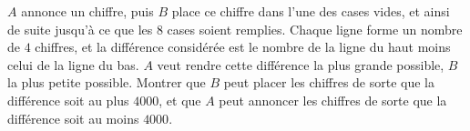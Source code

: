 $A$ annonce un chiffre, puis $B$ place ce chiffre dans l'une des cases vides, et ainsi de suite jusqu'à ce que les $8$ cases soient remplies. Chaque ligne forme un nombre de $4$ chiffres, et la différence considérée est le nombre de la ligne du haut moins celui de la ligne du bas. $A$ veut rendre cette différence la plus grande possible, $B$ la plus petite possible. Montrer que $B$ peut placer les chiffres de sorte que la différence soit au plus $4000$, et que $A$ peut annoncer les chiffres de sorte que la différence soit au moins $4000$.
\begin{center}
\end{center}
